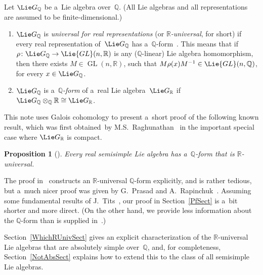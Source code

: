 \documentclass[pdftex]{sigma}
\DeclareMathOperator{\GL}{GL}
\numberwithin{equation}{section}
\newtheorem{prop}{Proposition}[section]
\begin{document}
\begin{defn}
Let $\Lie G_\mathbb{Q}$ be a~Lie algebra over~$\mathbb{Q}$.
(All Lie algebras and all representations are assumed to be f\/inite-dimensional.)
\begin{enumerate}\itemsep=0pt
\item $\Lie G_\mathbb{Q}$ is \emph{universal for real representations} (or \emph{$\mathbb{R}$-universal}, for short) if
every real representation of~$\Lie G_\mathbb{Q}$ has a~$\mathbb{Q}$-form~\cite[Def\/inition~7.1]{Morris-RRepsQForms}.
This means that if $\rho \colon \Lie G_\mathbb{Q} \to \Lie{GL}(n,\mathbb{R})$ is any ($\mathbb{Q}$-linear) Lie algebra
homomorphism, then there exists $M \in \GL(n,\mathbb{R})$, such that $M \rho(x) M^{-1} \in \Lie{GL}(n,\mathbb{Q})$, for
every $x \in \Lie G_\mathbb{Q}$.
\item $\Lie G_\mathbb{Q}$ is a~\emph{$\mathbb{Q}$-form} of a~real Lie algebra~$\Lie G_\mathbb{R}$ if $\Lie G_\mathbb{Q}
\otimes_\mathbb{Q} \mathbb{R} \cong \Lie G_\mathbb{R}$.
\end{enumerate}
\end{defn}

This note uses Galois cohomology to present a~short proof of the following known result, which was f\/irst obtained~by
M.S.~Raghunathan~\cite[\S~3]{Raghunathan-ArithLattsSSGrps} in the important special case where $\Lie G_\mathbb{R}$ is
compact.

\begin{prop}[]\label{HasRUniv}
Every real semisimple Lie algebra has a~$\mathbb{Q}$-form that is $\mathbb{R}$-universal.
\end{prop}

The proof in~\cite{Morris-RRepsQForms} constructs an $\mathbb{R}$-universal $\mathbb{Q}$-form explicitly, and is rather
tedious, but a~much nicer proof was given by G.~Prasad and A.~Rapinchuk~\cite[Proposition~3 and Remark~3]{PrasadRapinchuk-Prescribed}.
Assuming some fundamental results of J.~Tits~\cite{Tits-RepLinIrred}, our proof in Section~\ref{PfSect} is a~bit shorter and
more direct.
(On the other hand, we provide less information about the $\mathbb{Q}$-form than is supplied
in~\cite{PrasadRapinchuk-Prescribed}.)

Section~\ref{WhichRUnivSect} gives an explicit characterization of the $\mathbb{R}$-universal Lie algebras that are absolutely
simple over~$\mathbb{Q}$, and, for completeness, Section~\ref{NotAbsSect} explains how to extend this to the class of all
semisimple Lie algebras.
\end{document}
